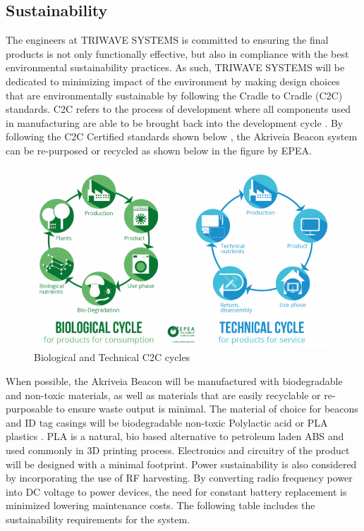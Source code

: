 \break
\subsection{Sustainability}
The engineers at TRIWAVE SYSTEMS is committed to ensuring the final products is not only functionally effective, but also in compliance with the best environmental sustainability practices. As such, TRIWAVE SYSTEMS will be dedicated to minimizing impact of the environment by making design choices that are environmentally sustainable by following the Cradle to Cradle (\Gls{C2C}) standards. C2C refers to the process of development where all components used in manufacturing are able to be brought back into the development cycle \cite{R23}. By following the C2C Certified standards shown below \cite{R25}, the Akriveia Beacon system can be re-purposed or recycled as shown below in the figure by EPEA.

\begin{figure}[H]
\centering
    \includegraphics[scale=0.85]{./images/BioTechCycle.png}
    \caption{Biological and Technical C2C cycles}
\end{figure}

When possible, the Akriveia Beacon will be manufactured with biodegradable and non-toxic materials, as well as materials that are easily recyclable or re-purposable to ensure waste output is minimal. The material of choice for beacons and ID tag casings will be biodegradable non-toxic Polylactic acid or PLA plastics \cite{R25}. PLA is a natural, bio based alternative to petroleum laden ABS and used commonly in 3D printing process. Electronics and circuitry of the product will be designed with a minimal footprint. Power sustainability is also considered by incorporating the use of RF harvesting. By converting radio frequency power into DC voltage to power devices, the need for constant battery replacement is minimized lowering maintenance costs. The following table includes the sustainability requirements for the system.

